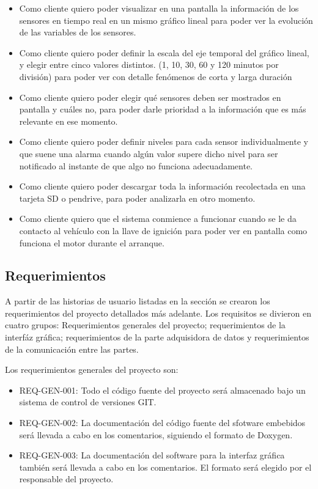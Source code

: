 \begin{itemize}
\item Como cliente quiero poder visualizar en una pantalla la información de los sensores en tiempo real en un mismo gráfico lineal para poder ver la evolución de las variables de los sensores.
\item Como cliente quiero poder definir la escala del eje temporal del gráfico lineal, y elegir entre cinco valores distintos. (1, 10, 30, 60 y 120 minutos por división) para poder ver con detalle fenómenos de corta y larga duración
\item Como cliente quiero poder elegir qué sensores deben ser mostrados en pantalla y cuáles no, para poder darle prioridad a la información que es más relevante en ese momento.
\item Como cliente quiero poder definir niveles para cada sensor individualmente y que suene una alarma cuando algún valor supere dicho nivel para ser notificado al instante de que algo no funciona adecuadamente.
\item Como cliente quiero poder descargar toda la información recolectada en una tarjeta SD o pendrive, para poder analizarla en otro momento.
\item Como cliente quiero que el sistema conmience a funcionar cuando se le da contacto al vehículo con la llave de ignición para poder ver en pantalla como funciona el motor durante el arranque.
\end{itemize}

\subsection{Requerimientos}

A partir de las historias de usuario listadas en la sección  se crearon los requerimientos del proyecto detallados más adelante. Los requisitos se divieron en cuatro grupos: Requerimientos generales del proyecto; requerimientos de la interfáz gráfica; requerimientos de la parte adquisidora de datos y requerimientos de la comunicación entre las partes.

Los requerimientos generales del proyecto son:
\begin{itemize}
\item REQ-GEN-001: Todo el código fuente del proyecto será almacenado bajo un sistema de control de versiones GIT.
\item REQ-GEN-002: La documentación del código fuente del sfotware embebidos será llevada a cabo en los comentarios, siguiendo el formato de Doxygen.
\item REQ-GEN-003: La documentación del software para la interfaz gráfica también será llevada a cabo en los comentarios. El formato será elegido por el responsable del proyecto.
\end{itemize}

